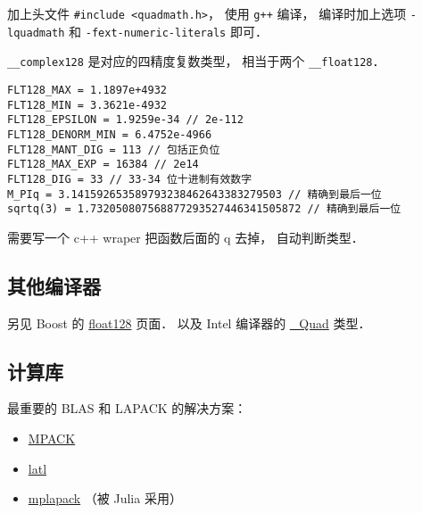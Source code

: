 加上头文件 \verb|#include <quadmath.h>|， 使用 \verb|g++| 编译， 编译时加上选项 \verb|-lquadmath| 和 \verb|-fext-numeric-literals| 即可．

\verb|__complex128| 是对应的四精度复数类型， 相当于两个 \verb|__float128|．

\begin{lstlisting}
FLT128_MAX = 1.1897e+4932
FLT128_MIN = 3.3621e-4932
FLT128_EPSILON = 1.9259e-34 // 2e-112
FLT128_DENORM_MIN = 6.4752e-4966
FLT128_MANT_DIG = 113 // 包括正负位
FLT128_MAX_EXP = 16384 // 2e14
FLT128_DIG = 33 // 33-34 位十进制有效数字
M_PIq = 3.141592653589793238462643383279503 // 精确到最后一位
sqrtq(3) = 1.732050807568877293527446341505872 // 精确到最后一位
\end{lstlisting}
需要写一个 c++ wraper 把函数后面的 q 去掉， 自动判断类型．

\subsection{其他编译器}
另见 Boost 的 \href{https://www.boost.org/doc/libs/develop/libs/multiprecision/doc/html/boost_multiprecision/tut/floats/float128.html}{float128} 页面． 以及 Intel 编译器的 \href{https://community.intel.com/t5/Intel-C-Compiler/Quad-precision-Quad-data-type/td-p/1218636}{_Quad} 类型．

\subsection{计算库}
最重要的 BLAS 和 LAPACK 的解决方案：
\begin{itemize}
\item \href{http://mplapack.sourceforge.net/}{MPACK}
\item \href{https://github.com/langou/latl}{latl}
\item \href{https://github.com/nakatamaho/mplapack}{mplapack} （被 Julia 采用）

\end{itemize}

